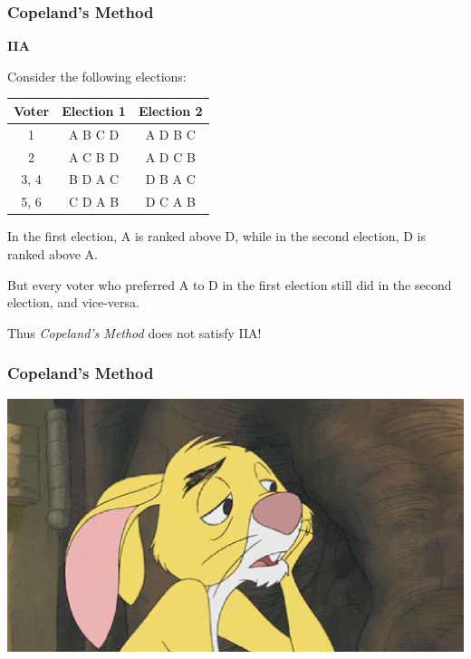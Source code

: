 \documentclass{beamer}
\newcommand{\heading}[1]{{\Large\bfseries #1}\vspace{1em}}
\begin{document}
    \begin{frame}
        \frametitle{Copeland's Method}
        \heading{IIA}

        Consider the following elections:
        \begin{center}
            \begin{tabular}{|c|c|c|}
                \hline
                Voter & Election 1 & Election 2 \\
                \hline
                1 & A B C D & A D B C \\
                2 & A C B D & A D C B \\
                3, 4 & B D A C & D B A C \\
                5, 6 & C D A B & D C A B \\
                \hline
            \end{tabular}
        \end{center} \pause

        In the first election, A is ranked above D, while in the second election, D is ranked above A. \pause

        \alert{But} every voter who preferred A to D in the first election still did in the second election, and vice-versa. \pause

        Thus \emph{Copeland's Method} \alert{does not satisfy} IIA!
    
    \end{frame}
    \begin{frame}
        \frametitle{Copeland's Method}
    
        \begin{center}
            \includegraphics[width=0.6\linewidth]{sigh.png}
        \end{center}
    
    \end{frame}
\end{document}
